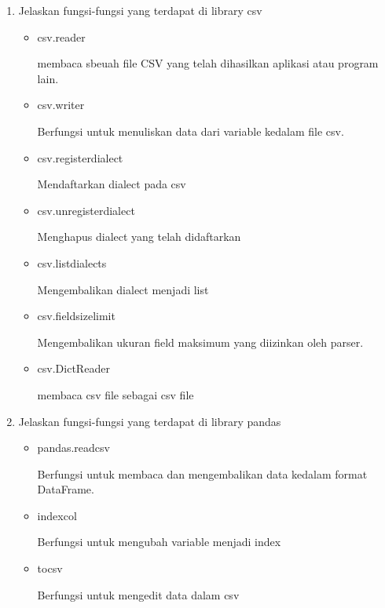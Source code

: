 \begin{enumerate}
\item Jelaskan fungsi-fungsi yang terdapat di library csv
\begin{itemize}
	\item csv.reader
	
	membaca sbeuah file CSV yang telah dihasilkan aplikasi atau program lain. 
	
	\item csv.writer
	
	Berfungsi untuk menuliskan data dari variable kedalam file csv.
	
	\item csv.register\textunderscore dialect
	
	Mendaftarkan dialect pada csv
	\item csv.unregister\textunderscore dialect
	
	Menghapus dialect yang telah didaftarkan
	
	\item csv.list\textunderscore dialects
	
	Mengembalikan dialect menjadi list
	
	\item csv.field\textunderscore size\textunderscore limit
	
	Mengembalikan ukuran field maksimum yang diizinkan oleh parser.
	
	\item csv.DictReader
	
	membaca csv file sebagai csv file
	
\end{itemize}

\item Jelaskan fungsi-fungsi yang terdapat di library pandas
\begin{itemize}
	\item pandas.read\textunderscore csv
	
	Berfungsi untuk membaca dan mengembalikan data kedalam format DataFrame. 
	
	\item index\textunderscore col

	Berfungsi untuk mengubah variable menjadi index
	\item to\textunderscore csv
	
	Berfungsi untuk mengedit data dalam csv

\end{itemize}
\end{enumerate}
